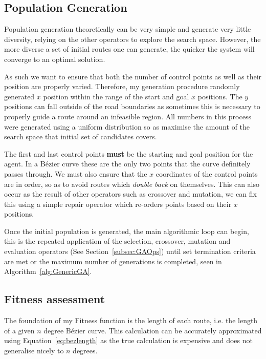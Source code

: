 \subsection{Population Generation}

Population generation theoretically can be very simple and generate very little diversity, relying on the other operators to explore the search space. However, the more diverse a set of initial routes one can generate, the quicker the system will converge to an optimal solution.

As such we want to ensure that both the number of control points as well as their position are properly varied. Therefore, my generation procedure randomly generated $x$ position within the range of the start and goal $x$ positions. The $y$ positions can fall outside of the road boundaries as sometimes this is necessary to properly guide a route around an infeasible region. All numbers in this process were generated using a uniform distribution so as maximise the amount of the search space that initial set of candidates covers.

The first and last control points \textbf{must} be the starting and goal position for the agent. In a Bézier curve these are the only two points that the curve definitely passes through. We must also ensure that the $x$ coordinates of the control points are in order, so as to avoid routes which \textit{double back} on themselves. This can also occur as the result of other operators such as crossover and mutation, we can fix this using a simple repair operator which re-orders points based on their $x$ positions.

Once the initial population is generated, the main algorithmic loop can begin, this is the repeated application of the selection, crossover, mutation and evaluation operators (See Section~\ref{subsec:GAOps}) until set termination criteria are met or the maximum number of generations is completed, seen in Algorithm~\ref{alg:GenericGA}.

\subsection{Fitness assessment}

The foundation of my Fitness function is the length of each route, i.e. the length of a given $n$ degree Bézier curve. This calculation can be accurately approximated using Equation~\ref{eq:bezlength} as the true calculation is expensive and does not generalise nicely to $n$ degrees\cite{gravesenAdaptiveSubdivisionLength1997}.

